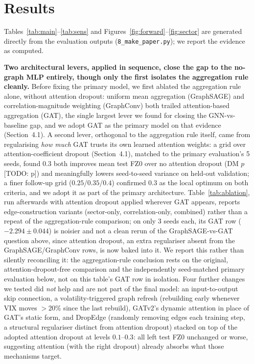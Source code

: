 \documentclass{llncs}
\newcommand{\todo}[1]{{\color{red}[TODO: #1]}}
\newcommand{\nAblSeeds}{3}
\newcommand{\attnVsBaseP}{\todo{p}}
\begin{document}
\section{Results}
\label{sec:results}
Tables~\ref{tab:main}--\ref{tab:sens} and Figures~\ref{fig:forward}--\ref{fig:sector}
are generated directly from the evaluation outputs (\texttt{8\_make\_paper.py});
we report the evidence as computed.

\textbf{Two architectural levers, applied in sequence, close the gap to the
no-graph MLP entirely, though only the first isolates the aggregation rule
cleanly.} Before fixing the primary model, we first ablated the aggregation
rule alone, without attention dropout: uniform mean aggregation (GraphSAGE)
and correlation-magnitude weighting (GraphConv) both trailed attention-based
aggregation (GAT), the single largest lever we found for closing the
GNN-vs-baseline gap, and we adopt GAT as the primary model on that evidence
(Section~4.1). A second lever, orthogonal to the aggregation rule itself, came
from regularising \emph{how much} GAT trusts its own learned attention
weights: a grid over attention-coefficient dropout (Section~4.1), matched to
the primary evaluation's 5 seeds, found $0.3$ both improves mean test FZ0 over
no attention dropout (DM $p$\attnVsBaseP) and meaningfully lowers seed-to-seed
variance on held-out validation; a finer follow-up grid ($0.25$/$0.35$/$0.4$)
confirmed $0.3$ as the local optimum on both criteria, and we adopt it as part
of the primary architecture. Table~\ref{tab:ablation}, run afterwards with
attention dropout applied wherever GAT appears, reports edge-construction
variants (sector-only, correlation-only, combined) rather than a repeat of the
aggregation-rule comparison; on only \nAblSeeds{} seeds each, its GAT row
($-2.294\pm0.044$) is noisier and not a clean rerun of the
GraphSAGE-vs-GAT question above, since attention dropout, an extra
regulariser absent from the GraphSAGE/GraphConv rows, is now baked into it.
We report this rather than silently reconciling it: the aggregation-rule
conclusion rests on the original, attention-dropout-free comparison and the
independently seed-matched primary evaluation below, not on this table's GAT
row in isolation. Four further changes we tested did \emph{not} help and are
not part of the final model: an input-to-output skip connection, a
volatility-triggered graph refresh (rebuilding early whenever VIX moves
$>$20\% since the last rebuild), GATv2's dynamic attention in place of GAT's
static form, and DropEdge \citep{rong2020} (randomly removing edges each
training step, a structural regulariser distinct from attention dropout)
stacked on top of the adopted attention dropout at levels $0.1$--$0.3$: all
left test FZ0 unchanged or worse, suggesting attention (with the right
dropout) already absorbs what those mechanisms target.
\end{document}
